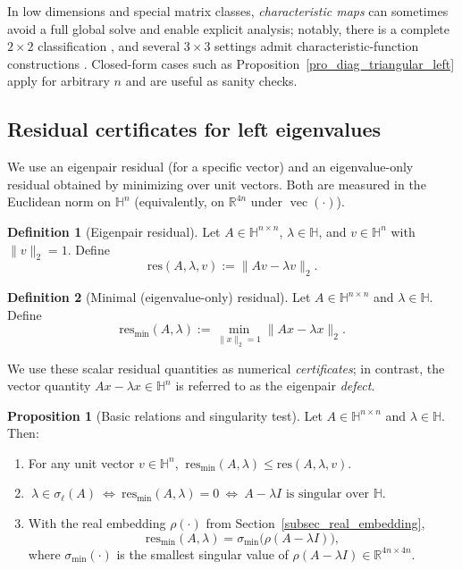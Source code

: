 \documentclass[preprint,12pt]{elsarticle}  %
\theoremstyle{definition}
\newtheorem{Def}{Definition}
\theoremstyle{definition}
\theoremstyle{definition}
\theoremstyle{definition}
\theoremstyle{definition}
\newtheorem{Pro}{Proposition}
\theoremstyle{remark}
\theoremstyle{remark}
\theoremstyle{remark}
\newcommand{\RR}{\mathbb{R}}
\newcommand{\HH}{\mathbb{H}}
\DeclareMathOperator{\rvec}{vec}
\begin{document}
In low dimensions and special matrix classes, \emph{characteristic maps} can sometimes avoid a full global solve and enable explicit analysis; notably, there is a complete $2\times2$ classification \cite{HuangSo2001}, and several $3\times3$ settings admit characteristic-function constructions \cite{MaciasVirgosPereiraSaez2014b,MaciasVirgosPereiraSaez2014}.
Closed-form cases such as Proposition~\ref{pro_diag_triangular_left} apply for arbitrary $n$ and are useful as sanity checks.

\subsection{Residual certificates for left eigenvalues}
\label{subsec:residual_certificates}
We use an eigenpair residual (for a specific vector) and an eigenvalue-only residual obtained by minimizing over unit vectors. Both are measured in the Euclidean norm on $\HH^n$ (equivalently, on $\RR^{4n}$ under $\rvec(\cdot)$).

\begin{Def}[Eigenpair residual]
\label{def:res_eigenpair}
Let $A\in\HH^{n\times n}$, $\lambda\in\HH$, and $v\in\HH^n$ with $\|v\|_2=1$. Define
\[
\mathrm{res}(A,\lambda,v) := \|Av-\lambda v\|_2.
\]
\end{Def}

\begin{Def}[Minimal (eigenvalue-only) residual]
\label{def:res_min}
Let $A\in\HH^{n\times n}$ and $\lambda\in\HH$. Define
\[
\mathrm{res}_{\min}(A,\lambda)
:=\min_{\|x\|_2=1}\|Ax-\lambda x\|_2.
\]
\end{Def}
We use these scalar residual quantities as numerical \emph{certificates}; in contrast, the vector quantity $Ax-\lambda x\in\HH^n$ is referred to as the eigenpair \emph{defect}.

\begin{Pro}[Basic relations and singularity test]
\label{pro:res_basic}
Let $A\in\HH^{n\times n}$ and $\lambda\in\HH$. Then:
\begin{enumerate}
\item For any unit vector $v\in\HH^n$, $\ \mathrm{res}_{\min}(A,\lambda)\le \mathrm{res}(A,\lambda,v)$.
\item $\ \lambda\in\sigma_\ell(A)\ \Longleftrightarrow\ \mathrm{res}_{\min}(A,\lambda)=0
\ \Longleftrightarrow\ A-\lambda I \text{ is singular over }\HH.$
\item With the real embedding $\rho(\cdot)$ from Section~\ref{subsec_real_embedding},
\[
\mathrm{res}_{\min}(A,\lambda)=\sigma_{\min}\bigl(\rho(A-\lambda I)\bigr),
\]
where $\sigma_{\min}(\cdot)$ is the smallest singular value of $\rho(A-\lambda I)\in\RR^{4n\times 4n}$.
\end{enumerate}
\end{Pro}
\end{document}
